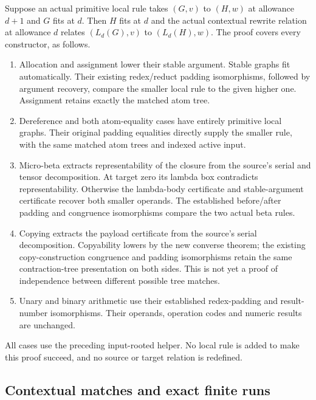Suppose an actual primitive local rule takes $(G,v)$ to $(H,w)$ at allowance
$d+1$ and $G$ fits at $d$. Then $H$ fits at $d$ and the actual contextual rewrite
relation at allowance $d$ relates $(L_d(G),v)$ to $(L_d(H),w)$.
The proof covers every constructor, as follows.
\begin{enumerate}
\item Allocation and assignment lower their stable argument. Stable graphs
fit automatically. Their existing redex/reduct padding isomorphisms, followed
by argument recovery, compare the smaller local rule to the given higher one.
Assignment retains exactly the matched atom tree.
\item Dereference and both atom-equality cases have entirely primitive
local graphs. Their original padding equalities directly supply the smaller
rule, with the same matched atom trees and indexed active input.
\item Micro-beta extracts representability of the closure from the source's
serial and tensor decomposition. At target zero its lambda box contradicts
representability. Otherwise the lambda-body certificate and stable-argument
certificate recover both smaller operands. The established before/after
padding and congruence isomorphisms compare the two actual beta rules.
\item Copying extracts the payload certificate from the source's serial
decomposition. Copyability lowers by the new converse theorem; the existing
copy-construction congruence and padding isomorphisms retain the same
contraction-tree presentation on both sides. This is not yet a proof of
independence between different possible tree matches.
\item Unary and binary arithmetic use their established redex-padding and
result-number isomorphisms. Their operands, operation codes and numeric
results are unchanged.
\end{enumerate}
All cases use the preceding input-rooted helper. No local rule is added to
make this proof succeed, and no source or target relation is redefined.


\subsection{Contextual matches and exact finite runs}

